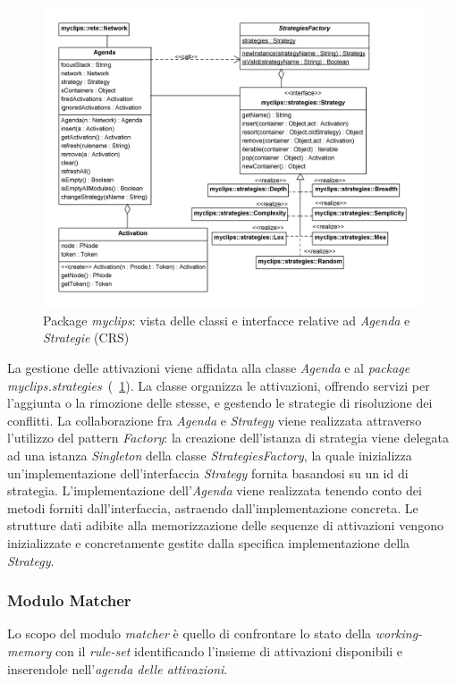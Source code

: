 \begin{figure}
\centering
\includegraphics[width=1\textwidth]{Immagini/Capitolo3/Classi/myclips_Agenda-Strategies.png}
\caption{Package \emph{myclips}: vista delle classi e interfacce relative ad  \emph{Agenda} e \emph{Strategie} (CRS)}\label{fig:class-myclips-agenda-strategies}
\end{figure}

La gestione delle attivazioni viene affidata alla classe \emph{Agenda} e al \emph{package} \emph{myclips.strategies}~(\figurename~\ref{fig:class-myclips-agenda-strategies}). La classe organizza le attivazioni, offrendo servizi per l'aggiunta o la rimozione delle stesse, e gestendo le strategie di risoluzione dei conflitti. La collaborazione fra \emph{Agenda} e \emph{Strategy} viene realizzata attraverso l'utilizzo del pattern \emph{Factory}: la creazione dell'istanza di strategia viene delegata ad una istanza \emph{Singleton} della classe \emph{StrategiesFactory}, la quale inizializza un'implementazione dell'interfaccia \emph{Strategy} fornita basandosi su un id di strategia. L'implementazione dell'\emph{Agenda} viene realizzata tenendo conto dei metodi forniti dall'interfaccia, astraendo dall'implementazione concreta. Le strutture dati adibite alla memorizzazione delle sequenze di attivazioni vengono inizializzate e concretamente gestite dalla specifica implementazione della \emph{Strategy}.


\subsubsection{Modulo Matcher}
Lo scopo del modulo \emph{matcher} è quello di confrontare lo stato della \emph{working-memory} con il \emph{rule-set} identificando l'insieme di attivazioni disponibili e inserendole nell'\emph{agenda delle attivazioni}.

